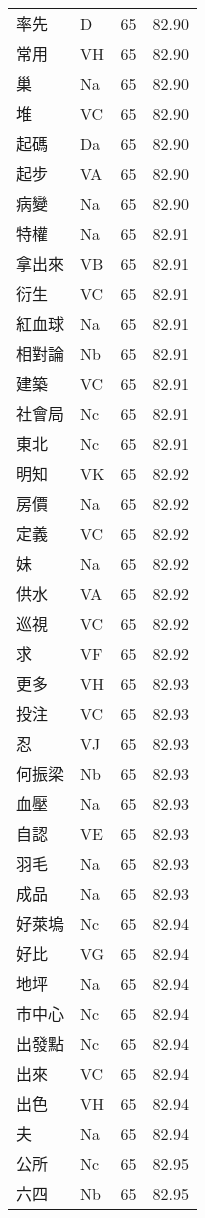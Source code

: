 \documentclass[twocolumn]{book}
\begin{document}
\begin{supertabular}{llrr}
率先 & D & 65 &  82.90\\
常用 & VH & 65 &  82.90\\
巢 & Na & 65 &  82.90\\
堆 & VC & 65 &  82.90\\
起碼 & Da & 65 &  82.90\\
起步 & VA & 65 &  82.90\\
病變 & Na & 65 &  82.90\\
特權 & Na & 65 &  82.91\\
拿出來 & VB & 65 &  82.91\\
衍生 & VC & 65 &  82.91\\
紅血球 & Na & 65 &  82.91\\
相對論 & Nb & 65 &  82.91\\
建築 & VC & 65 &  82.91\\
社會局 & Nc & 65 &  82.91\\
東北 & Nc & 65 &  82.91\\
明知 & VK & 65 &  82.92\\
房價 & Na & 65 &  82.92\\
定義 & VC & 65 &  82.92\\
妹 & Na & 65 &  82.92\\
供水 & VA & 65 &  82.92\\
巡視 & VC & 65 &  82.92\\
求 & VF & 65 &  82.92\\
更多 & VH & 65 &  82.93\\
投注 & VC & 65 &  82.93\\
忍 & VJ & 65 &  82.93\\
何振梁 & Nb & 65 &  82.93\\
血壓 & Na & 65 &  82.93\\
自認 & VE & 65 &  82.93\\
羽毛 & Na & 65 &  82.93\\
成品 & Na & 65 &  82.93\\
好萊塢 & Nc & 65 &  82.94\\
好比 & VG & 65 &  82.94\\
地坪 & Na & 65 &  82.94\\
市中心 & Nc & 65 &  82.94\\
出發點 & Nc & 65 &  82.94\\
出來 & VC & 65 &  82.94\\
出色 & VH & 65 &  82.94\\
夫 & Na & 65 &  82.94\\
公所 & Nc & 65 &  82.95\\
六四 & Nb & 65 &  82.95\\

\end{supertabular}
\end{document}
